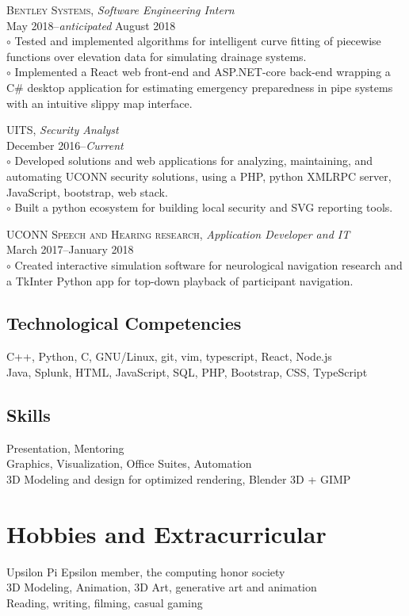 \documentclass[Letterpaper,11pt]{article}
\begin{document}
    \textsc{Bentley Systems},
    \textit{Software Engineering Intern}\\
    May 2018--\textit{anticipated} August 2018\\
        $\circ$ Tested and implemented algorithms for intelligent curve fitting of piecewise functions over elevation data for simulating drainage systems.
        \\
        $\circ$ Implemented a React web front-end and ASP.NET-core back-end wrapping a C\# desktop application for estimating emergency preparedness in pipe systems with an intuitive slippy map interface.

    \textsc{UITS},
    \textit{Security Analyst}\\
    December 2016--\textit{Current}\\
        $\circ$ Developed solutions and web applications for analyzing, maintaining, and automating UCONN security solutions, using a PHP, python XMLRPC server, JavaScript, bootstrap, web stack.
        \\
        $\circ$ Built a python ecosystem for building local security and SVG reporting tools.

    \textsc{UCONN Speech and Hearing research},
    \textit{Application Developer and IT}\\
    March 2017--January 2018\\
        $\circ$ Created interactive simulation software for neurological navigation research and a TkInter Python app for top-down playback of participant navigation.

\begin{multicols}{2}

    \subsection*{Technological Competencies}

        C++, Python, C, GNU/Linux, git, vim, typescript, React, Node.js
        \\
        Java, Splunk, HTML, JavaScript, SQL, PHP, Bootstrap, CSS, TypeScript

    \subsection*{Skills}

        Presentation, Mentoring\\
        Graphics, Visualization, Office Suites, Automation\\
        3D Modeling and design for optimized rendering, Blender 3D + GIMP

\end{multicols}

\section*{Hobbies and Extracurricular}

    Upsilon Pi Epsilon member, the computing honor society\\
    3D Modeling, Animation, 3D Art, generative art and animation\\
    Reading, writing, filming, casual gaming

\clearpage
\end{document}
